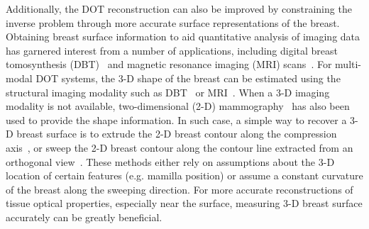 Additionally, the DOT reconstruction can also be improved by constraining the inverse problem through more accurate surface representations of the breast. Obtaining breast surface information to aid quantitative analysis of imaging data has garnered interest from a number of applications, including digital breast tomosynthesis (DBT)~\cite{Rodriguez2017} and magnetic resonance imaging (MRI) scans~\cite{Pallone2014, Ortiz2012}. For multi-modal DOT systems, the 3-D shape of the breast can be estimated using the structural imaging modality such as DBT~\cite{Fang2011} or MRI~\cite{Brooksby2006}. When a 3-D imaging modality is not available, two-dimensional (2-D) mammography~\cite{Deng2015a} has also been used to provide the shape information. In such case, a simple way to recover a 3-D breast surface is to extrude the 2-D breast contour along the compression axis~\cite{Kruger2013, Kalbhen1999}, or sweep the 2-D breast contour along the contour line extracted from an orthogonal view~\cite{Kita1998}. These methods either rely on assumptions about the 3-D location of certain features (e.g. mamilla position) or assume a constant curvature of the breast along the sweeping direction. For more accurate reconstructions of tissue optical properties, especially near the surface, measuring 3-D breast surface accurately can be greatly beneficial.

